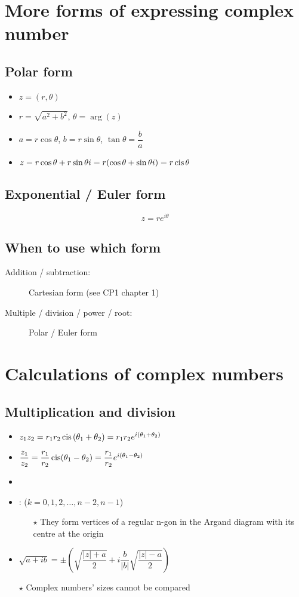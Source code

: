 \section{More forms of expressing complex number}
\subsection{Polar form}
\begin{itemize}
    \item $z=(r,\theta)$
    \item $r=\sqrt{a^2+b^2}$, $\theta = \arg(z)$
    \item $a=r\cos\theta$, $b=r\sin\theta$, $\tan\theta=\dfrac{b}{a}$
    \item $z=r\cos\theta+r\sin\theta i = r(\cos\theta+\sin\theta i)=r\operatorname{cis} \theta$
\end{itemize}
\subsection{Exponential / Euler form}
$$z=re^{i\theta}$$
\subsection{When to use which form}
\begin{description}
    \item[Addition / subtraction: ] Cartesian form (see CP1 chapter 1)
    \item[Multiple / division / power / root: ] Polar / Euler form
\end{description}

\section{Calculations of complex numbers}
\subsection{Multiplication and division}
\begin{itemize}
    \item $z_1z_2=r_1r_2\operatorname{cis}\left(\theta_1+\theta_2\right)=r_1r_2e^{i(\theta_1+\theta_2)}$
    \item $\dfrac{z_1}{z_2}=\dfrac{r_1}{r_2}\operatorname{cis}(\theta_1-\theta_2)=\dfrac{r_1}{r_2}e^{i(\theta_1-\theta_2)}$
    \item
    \item :  ($k=0,1,2,\dots,n-2,n-1$)
          \begin{itemize}
              \item[$\star$] They form vertices of a regular n-gon in the Argand diagram with its centre at the origin
          \end{itemize}
    \item $\sqrt{a+ib}=\pm\left(\sqrt{\dfrac{|z|+a}{2}}+i\dfrac{b}{|b|}\sqrt{\dfrac{|z|-a}{2}}\right)$

    \item[$\star$] Complex numbers' sizes cannot be compared
\end{itemize}

